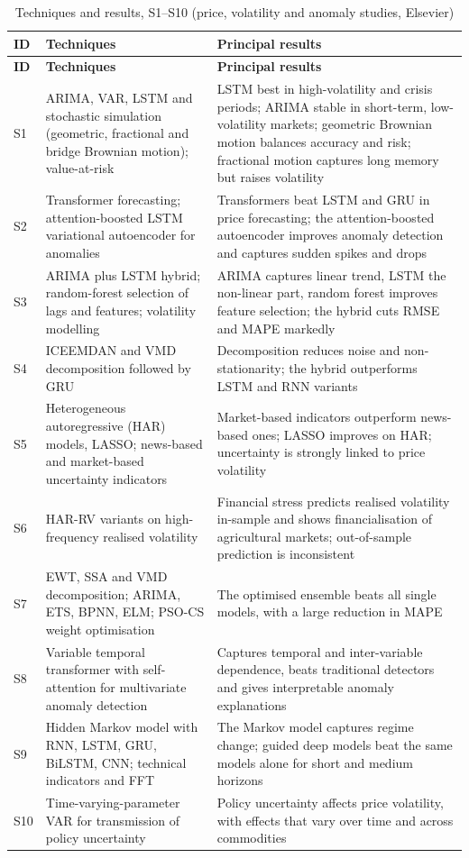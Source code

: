 {\footnotesize\setlength{\tabcolsep}{4pt}\renewcommand{\arraystretch}{1.15}
\begin{longtable}{|p{0.9cm}|p{5.8cm}|p{9.2cm}|}
\caption{Techniques and results, S1--S10 (price, volatility and anomaly studies, Elsevier)}\label{tab:survey-t1}\\
\hline \textbf{ID} & \textbf{Techniques} & \textbf{Principal results} \\ \hline \endfirsthead
\hline \textbf{ID} & \textbf{Techniques} & \textbf{Principal results} \\ \hline \endhead
\hline \endfoot
S1 & ARIMA, VAR, LSTM and stochastic simulation (geometric, fractional and bridge Brownian motion); value-at-risk & LSTM best in high-volatility and crisis periods; ARIMA stable in short-term, low-volatility markets; geometric Brownian motion balances accuracy and risk; fractional motion captures long memory but raises volatility \\ \hline
S2 & Transformer forecasting; attention-boosted LSTM variational autoencoder for anomalies & Transformers beat LSTM and GRU in price forecasting; the attention-boosted autoencoder improves anomaly detection and captures sudden spikes and drops \\ \hline
S3 & ARIMA plus LSTM hybrid; random-forest selection of lags and features; volatility modelling & ARIMA captures linear trend, LSTM the non-linear part, random forest improves feature selection; the hybrid cuts RMSE and MAPE markedly \\ \hline
S4 & ICEEMDAN and VMD decomposition followed by GRU & Decomposition reduces noise and non-stationarity; the hybrid outperforms LSTM and RNN variants \\ \hline
S5 & Heterogeneous autoregressive (HAR) models, LASSO; news-based and market-based uncertainty indicators & Market-based indicators outperform news-based ones; LASSO improves on HAR; uncertainty is strongly linked to price volatility \\ \hline
S6 & HAR-RV variants on high-frequency realised volatility & Financial stress predicts realised volatility in-sample and shows financialisation of agricultural markets; out-of-sample prediction is inconsistent \\ \hline
S7 & EWT, SSA and VMD decomposition; ARIMA, ETS, BPNN, ELM; PSO-CS weight optimisation & The optimised ensemble beats all single models, with a large reduction in MAPE \\ \hline
S8 & Variable temporal transformer with self-attention for multivariate anomaly detection & Captures temporal and inter-variable dependence, beats traditional detectors and gives interpretable anomaly explanations \\ \hline
S9 & Hidden Markov model with RNN, LSTM, GRU, BiLSTM, CNN; technical indicators and FFT & The Markov model captures regime change; guided deep models beat the same models alone for short and medium horizons \\ \hline
S10 & Time-varying-parameter VAR for transmission of policy uncertainty & Policy uncertainty affects price volatility, with effects that vary over time and across commodities \\ \hline
\end{longtable}}

